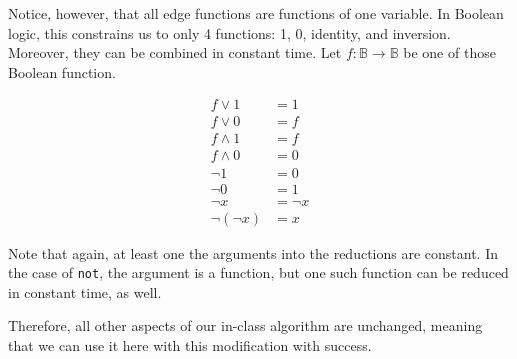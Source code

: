 \documentclass{article}
\begin{document}
Notice, however, that all edge functions are functions of one variable.
In Boolean logic, this constrains us to only 4 functions: 1, 0, identity, and inversion.
Moreover, they can be combined in constant time.
Let $f: \mathbb{B} \to \mathbb{B}$ be one of those Boolean function.

\begin{align*}
    f \lor 1 &= 1\\
    f \lor 0 &= f\\
    f \land 1 &= f\\
    f \land 0 &= 0\\
    \lnot 1 &= 0\\
    \lnot 0 &= 1\\
    \lnot x &= \lnot x\\
    \lnot (\lnot x) &= x
\end{align*}

Note that again, at least one the arguments into the reductions are constant.
In the case of \verb|not|, the argument is a function, but one such function can be reduced in constant time, as well.

Therefore, all other aspects of our in-class algorithm are unchanged, meaning that we can use it here with this modification with success.
\end{document}
